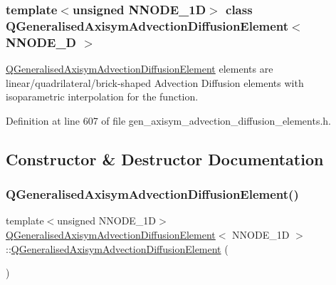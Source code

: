 \subsubsection*{template$<$unsigned N\+N\+O\+D\+E\+\_\+1D$>$\newline
class Q\+Generalised\+Axisym\+Advection\+Diffusion\+Element$<$ N\+N\+O\+D\+E\+\_\+D $>$}

\hyperlink{classQGeneralisedAxisymAdvectionDiffusionElement}{Q\+Generalised\+Axisym\+Advection\+Diffusion\+Element} elements are linear/quadrilateral/brick-\/shaped Advection Diffusion elements with isoparametric interpolation for the function. 

Definition at line 607 of file gen\+\_\+axisym\+\_\+advection\+\_\+diffusion\+\_\+elements.\+h.



\subsection{Constructor \& Destructor Documentation}
\mbox{\label{classQGeneralisedAxisymAdvectionDiffusionElement_a9761e7a7dfe27cf81f8fa5ce07150123}} 
\subsubsection{\texorpdfstring{Q\+Generalised\+Axisym\+Advection\+Diffusion\+Element()}{QGeneralisedAxisymAdvectionDiffusionElement()}\hspace{0.1cm}{\footnotesize\ttfamily [1/2]}}
{\footnotesize\ttfamily template$<$unsigned N\+N\+O\+D\+E\+\_\+1D$>$ \\
\hyperlink{classQGeneralisedAxisymAdvectionDiffusionElement}{Q\+Generalised\+Axisym\+Advection\+Diffusion\+Element}$<$ N\+N\+O\+D\+E\+\_\+1D $>$\+::\hyperlink{classQGeneralisedAxisymAdvectionDiffusionElement}{Q\+Generalised\+Axisym\+Advection\+Diffusion\+Element} (\begin{DoxyParamCaption}{ }\end{DoxyParamCaption})\hspace{0.3cm}{\ttfamily [inline]}}



